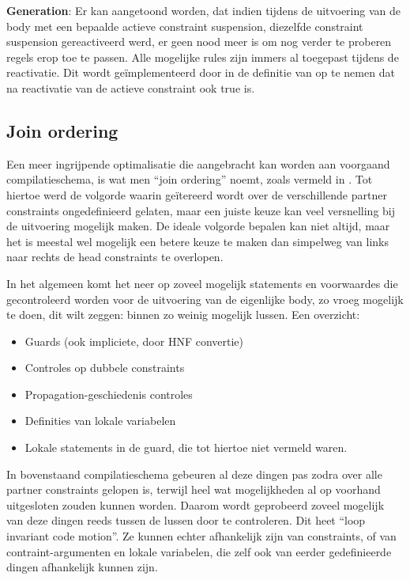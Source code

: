 {\bf Generation}: Er kan aangetoond worden, dat indien tijdens de uitvoering van de body met een bepaalde actieve constraint suspension, diezelfde constraint suspension gereactiveerd werd, er geen nood meer is om nog verder te proberen regels erop toe te passen. Alle mogelijke rules zijn immers al toegepast tijdens de reactivatie. Dit wordt ge\"implementeerd door in de definitie van  op te nemen dat  na reactivatie van de actieve constraint ook true is.

\subsection{Join ordering} \label{sec:joinorder}


Een meer ingrijpende optimalisatie die aangebracht kan worden aan voorgaand compilatieschema, is wat men ``join ordering'' noemt, zoals vermeld in \cite{duck:optimizing}. Tot hiertoe werd de volgorde waarin ge\"itereerd wordt over de verschillende partner constraints ongedefinieerd gelaten, maar een juiste keuze kan veel versnelling bij de uitvoering mogelijk maken. De ideale volgorde bepalen kan niet altijd, maar het is meestal wel mogelijk een betere keuze te maken dan simpelweg van links naar rechts de head constraints te overlopen.

In het algemeen komt het neer op zoveel mogelijk statements en voorwaardes die gecontroleerd worden voor de uitvoering van de eigenlijke body, zo vroeg mogelijk te doen, dit wilt zeggen: binnen zo weinig mogelijk lussen. Een overzicht: \begin{itemize}
  \item Guards (ook impliciete, door HNF convertie)
  \item Controles op dubbele constraints
  \item Propagation-geschiedenis controles
  \item Definities van lokale variabelen
  \item Lokale statements in de guard, die tot hiertoe niet vermeld waren.
\end{itemize}
In bovenstaand compilatieschema gebeuren al deze dingen pas zodra over alle partner constraints gelopen is, terwijl heel wat mogelijkheden al op voorhand uitgesloten zouden kunnen worden. Daarom wordt geprobeerd zoveel mogelijk van deze dingen reeds tussen de lussen door te controleren. Dit heet ``loop invariant code motion''. Ze kunnen echter afhankelijk zijn van constraints, of van contraint-argumenten en lokale variabelen, die zelf ook van eerder gedefinieerde dingen afhankelijk kunnen zijn.

